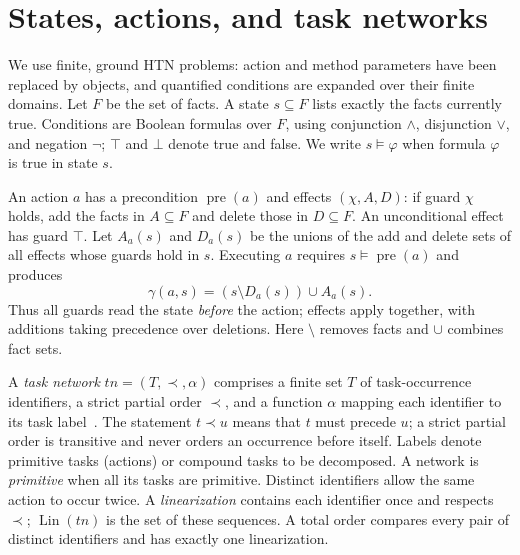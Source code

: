 \documentclass[10pt,a4paper,twocolumn]{article}
\newcommand{\Lin}{\operatorname{Lin}}
\newcommand{\pre}{\operatorname{pre}}
\begin{document}

\section{States, actions, and task networks}
We use finite, ground HTN problems: action and method parameters have been replaced by objects, and quantified conditions are expanded over their finite domains. Let $F$ be the set of facts. A state $s\subseteq F$ lists exactly the facts currently true. Conditions are Boolean formulas over $F$, using conjunction $\land$, disjunction $\lor$, and negation $\neg$; $\top$ and $\bot$ denote true and false. We write $s\models\varphi$ when formula $\varphi$ is true in state $s$.

An action $a$ has a precondition $\pre(a)$ and effects $(\chi,A,D)$: if guard $\chi$ holds, add the facts in $A\subseteq F$ and delete those in $D\subseteq F$. An unconditional effect has guard $\top$. Let $A_a(s)$ and $D_a(s)$ be the unions of the add and delete sets of all effects whose guards hold in $s$. Executing $a$ requires $s\models\pre(a)$ and produces
\begin{equation}\label{eq:transition}
 \gamma(a,s)=(s\setminus D_a(s))\cup A_a(s).
\end{equation}
Thus all guards read the state \emph{before} the action; effects apply together, with additions taking precedence over deletions. Here $\setminus$ removes facts and $\cup$ combines fact sets.

A \emph{task network} $tn=(T,\prec,\alpha)$ comprises a finite set $T$ of task-occurrence identifiers, a strict partial order $\prec$, and a function $\alpha$ mapping each identifier to its task label~\cite{geier}. The statement $t\prec u$ means that $t$ must precede $u$; a strict partial order is transitive and never orders an occurrence before itself. Labels denote primitive tasks (actions) or compound tasks to be decomposed. A network is \emph{primitive} when all its tasks are primitive. Distinct identifiers allow the same action to occur twice. A \emph{linearization} contains each identifier once and respects $\prec$; $\Lin(tn)$ is the set of these sequences. A total order compares every pair of distinct identifiers and has exactly one linearization.
\end{document}
